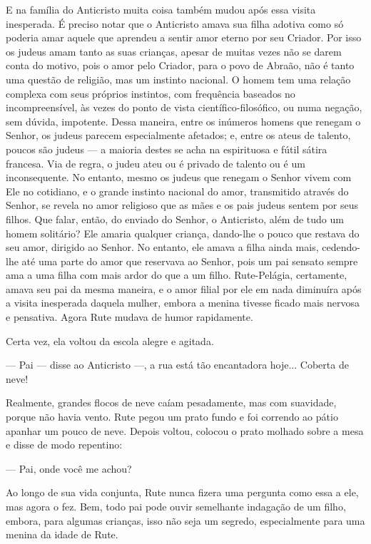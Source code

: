 E na família do Anticristo muita coisa também mudou após essa visita
inesperada. É preciso notar que o Anticristo amava sua filha adotiva
como só poderia amar aquele que aprendeu a sentir amor eterno por seu
Criador. Por isso os judeus amam tanto as suas crianças, apesar de
muitas vezes não se darem conta do motivo, pois o amor pelo Criador,
para o povo de Abraão, não é tanto uma questão de religião, mas um
instinto nacional. O homem tem uma relação complexa com seus próprios
instintos, com frequência baseados no incompreensível, às vezes do ponto
de vista científico-filosófico, ou numa negação, sem dúvida, impotente.
Dessa maneira, entre os inúmeros homens que renegam o Senhor, os judeus
parecem especialmente afetados; e, entre os ateus de talento, poucos são
judeus --- a maioria destes se acha na espirituosa e fútil sátira
francesa. Via de regra, o judeu ateu ou é privado de talento ou é um
inconsequente. No entanto, mesmo os judeus que renegam o Senhor vivem
com Ele no cotidiano, e o grande instinto nacional do amor, transmitido
através do Senhor, se revela no amor religioso que as mães e os pais
judeus sentem por seus filhos. Que falar, então, do enviado do Senhor, o
Anticristo, além de tudo um homem solitário? Ele amaria qualquer
criança, dando-lhe o pouco que restava do seu amor, dirigido ao Senhor.
No entanto, ele amava a filha ainda mais, cedendo-lhe até uma parte do
amor que reservava ao Senhor, pois um pai sensato sempre ama a uma filha
com mais ardor do que a um filho. Rute-Pelágia, certamente, amava seu
pai da mesma maneira, e o amor filial por ele em nada diminuíra após a
visita inesperada daquela mulher, embora a menina tivesse ficado mais
nervosa e pensativa. Agora Rute mudava de humor rapidamente.

Certa vez, ela voltou da escola alegre e agitada.

--- Pai --- disse ao Anticristo ---, a rua está tão encantadora hoje...
Coberta de neve!

Realmente, grandes flocos de neve caíam pesadamente, mas com suavidade,
porque não havia vento. Rute pegou um prato fundo e foi correndo ao
pátio apanhar um pouco de neve. Depois voltou, colocou o prato molhado
sobre a mesa e disse de modo repentino:

--- Pai, onde você me achou?

Ao longo de sua vida conjunta, Rute nunca fizera uma pergunta como essa
a ele, mas agora o fez. Bem, todo pai pode ouvir semelhante indagação de
um filho, embora, para algumas crianças, isso não seja um segredo,
especialmente para uma menina da idade de Rute.

